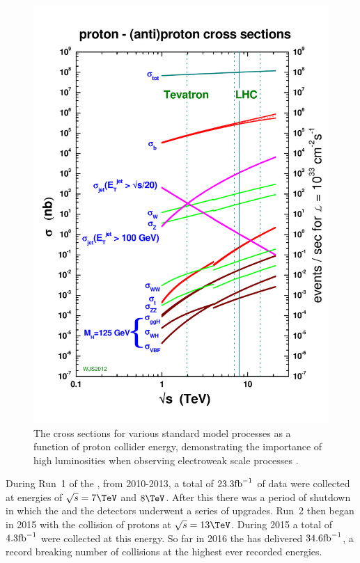 \begin{figure}
  \includegraphics[width=\mediumfigwidth]{figs/crosssections2012_v5}
  \caption[]%
  { The cross sections for various standard model processes as a
  function of proton collider energy, demonstrating the importance of
  high luminosities when observing electroweak scale processes
  \cite{stirlingCrossSec1}.}%
  \label{fig:xsecs}
\end{figure}

During Run~1 of the \LHC, from 2010-2013, a total of $23.3\text{fb}^{-1}$ of
data were collected at energies of $\sqrt{s}=7\tev$ and $8\tev$. After
this there was a period of shutdown in which the \LHC and the
detectors underwent a series of upgrades. Run~2 then began in 2015
with the collision of protons at $\sqrt{s}=13\tev$. During 2015 a
total of $4.3\text{fb}^{-1}$ were collected at this energy. So far in 2016 the
\LHC has delivered $34.6\text{fb}^{-1}$, a record breaking number of collisions
at the highest ever recorded energies.

